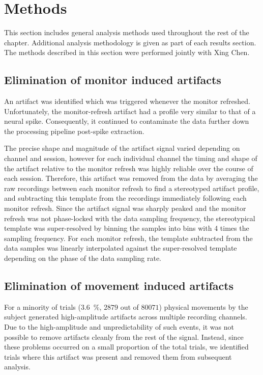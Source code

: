 \section{Methods}
\FloatBarrier

This section includes general analysis methods used throughout the rest of the chapter.
Additional analysis methodology is given as part of each results section.
The methods described in this section were performed jointly with Xing Chen.


\subsection{Elimination of monitor induced artifacts}
\label{sec:pl_artifact_elimination}
\label{sec:ma}

An artifact was identified which was triggered whenever the monitor refreshed.
Unfortunately, the monitor-refresh artifact had a profile very similar to that of a neural spike.
Consequently, it continued to contaminate the data further down the processing pipeline post-spike extraction.

The precise shape and magnitude of the artifact signal varied depending on channel and session, however for each individual channel the timing and shape of the artifact relative to the monitor refresh was highly reliable over the course of each session.
Therefore, this artifact was removed from the data by averaging the raw recordings between each monitor refresh to find a stereotyped artifact profile, and subtracting this template from the recordings immediately following each monitor refresh.
Since the artifact signal was sharply peaked and the monitor refresh was not phase-locked with the data sampling frequency, the stereotypical template was super-resolved by binning the samples into bins with 4 times the sampling frequency.
For each monitor refresh, the template subtracted from the data samples was linearly interpolated against the super-resolved template depending on the phase of the data sampling rate.


\subsection{Elimination of movement induced artifacts}

For a minority of trials (\SI{3.6}{\percent}, $2879$ out of $80071$) physical movements by the subject generated high-amplitude artifacts across multiple recording channels.
Due to the high-amplitude and unpredictability of such events, it was not possible to remove artifacts cleanly from the rest of the signal.
Instead, since these problems occurred on a small proportion of the total trials, we identified trials where this artifact was present and removed them from subsequent analysis.

